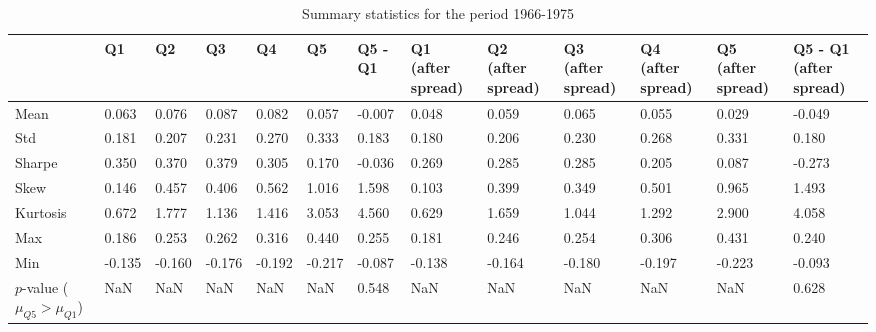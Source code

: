 \begin{table}
\caption{Summary statistics for the period 1966-1975}
\label{tab:summary_1966_1975}
\begin{tabular}{lllllllllllll}
\toprule
 & Q1 & Q2 & Q3 & Q4 & Q5 & Q5 - Q1 & Q1 (after spread) & Q2 (after spread) & Q3 (after spread) & Q4 (after spread) & Q5 (after spread) & Q5 - Q1 (after spread) \\
\midrule
Mean & 0.063 & 0.076 & 0.087 & 0.082 & 0.057 & -0.007 & 0.048 & 0.059 & 0.065 & 0.055 & 0.029 & -0.049 \\
Std & 0.181 & 0.207 & 0.231 & 0.270 & 0.333 & 0.183 & 0.180 & 0.206 & 0.230 & 0.268 & 0.331 & 0.180 \\
Sharpe & 0.350 & 0.370 & 0.379 & 0.305 & 0.170 & -0.036 & 0.269 & 0.285 & 0.285 & 0.205 & 0.087 & -0.273 \\
Skew & 0.146 & 0.457 & 0.406 & 0.562 & 1.016 & 1.598 & 0.103 & 0.399 & 0.349 & 0.501 & 0.965 & 1.493 \\
Kurtosis & 0.672 & 1.777 & 1.136 & 1.416 & 3.053 & 4.560 & 0.629 & 1.659 & 1.044 & 1.292 & 2.900 & 4.058 \\
Max & 0.186 & 0.253 & 0.262 & 0.316 & 0.440 & 0.255 & 0.181 & 0.246 & 0.254 & 0.306 & 0.431 & 0.240 \\
Min & -0.135 & -0.160 & -0.176 & -0.192 & -0.217 & -0.087 & -0.138 & -0.164 & -0.180 & -0.197 & -0.223 & -0.093 \\
$p$-value ($\mu_{Q5} > \mu_{Q1}$) & NaN & NaN & NaN & NaN & NaN & 0.548 & NaN & NaN & NaN & NaN & NaN & 0.628 \\
\bottomrule
\end{tabular}
\end{table}
